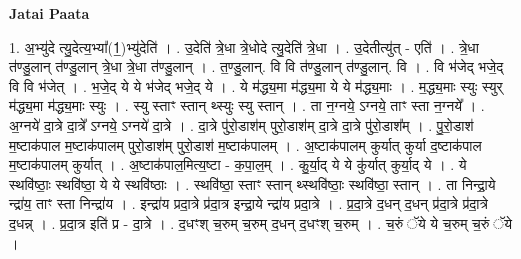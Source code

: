 \documentclass[17pt]{extarticle}
\begin{document}
\textbf{Jatai Paata} \newline

1. अ॒भ्यु॑दे त्यु॒देत्य॒भ्या᳚(1॒)भ्यु॑देति॑ । . उ॒देति॑ त्रे॒धा त्रे॒धोदे त्यु॒देति॑ त्रे॒धा । . उ॒देतीत्यु॑त् - एति॑ । . त्रे॒धा त॑ण्डु॒लान् त॑ण्डु॒लान् त्रे॒धा त्रे॒धा त॑ण्डु॒लान् । . त॒ण्डु॒लान्. वि वि त॑ण्डु॒लान् त॑ण्डु॒लान्. वि । . वि भ॑जेद् भजे॒द् वि वि भ॑जेत् । . भ॒जे॒द् ये ये भ॑जेद् भजे॒द् ये । . ये म॑द्ध्य॒मा म॑द्ध्य॒मा ये ये म॑द्ध्य॒माः । . म॒द्ध्य॒माः स्युः स्युर् म॑द्ध्य॒मा म॑द्ध्य॒माः स्युः । . स्यु स्ताꣳ स्तान् थ्स्युः स्यु स्तान् । . ता न॒ग्नये॒ ऽग्नये॒ ताꣳ स्ता न॒ग्नये᳚ । . अ॒ग्नये॑ दा॒त्रे दा॒त्रे᳚ ऽग्नये॒ ऽग्नये॑ दा॒त्रे । . दा॒त्रे पु॑रो॒डाश॑म् पुरो॒डाश॑म् दा॒त्रे दा॒त्रे पु॑रो॒डाश᳚म् । . पु॒रो॒डाश॑ म॒ष्टाक॑पाल म॒ष्टाक॑पालम् पुरो॒डाश॑म् पुरो॒डाश॑ म॒ष्टाक॑पालम् । . अ॒ष्टाक॑पालम् कुर्यात् कुर्या द॒ष्टाक॑पाल म॒ष्टाक॑पालम् कुर्यात् । . अ॒ष्टाक॑पाल॒मित्य॒ष्टा - क॒पा॒ल॒म् । . कु॒र्या॒द् ये ये कु॑र्यात् कुर्या॒द् ये । . ये स्थवि॑ष्ठाः॒ स्थवि॑ष्ठा॒ ये ये स्थवि॑ष्ठाः । . स्थवि॑ष्ठा॒ स्ताꣳ स्तान् थ्स्थवि॑ष्ठाः॒ स्थवि॑ष्ठा॒ स्तान् । . ता निन्द्रा॒ये न्द्रा॑य॒ ताꣳ स्ता निन्द्रा॑य । . इन्द्रा॑य प्रदा॒त्रे प्र॑दा॒त्र इन्द्रा॒ये न्द्रा॑य प्रदा॒त्रे । . प्र॒दा॒त्रे द॒धन् द॒धन् प्र॑दा॒त्रे प्र॑दा॒त्रे द॒धन्न् । . प्र॒दा॒त्र इति॑ प्र - दा॒त्रे । . द॒धꣳश् च॒रुम् च॒रुम् द॒धन् द॒धꣳश् च॒रुम् । . च॒रुं ॅये ये च॒रुम् च॒रुं ॅये । \newline
\end{document}
